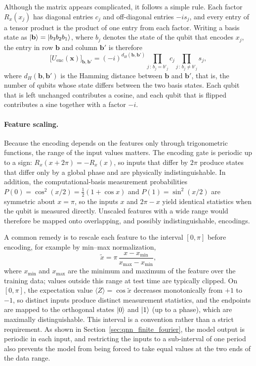 \documentclass[12pt]{article}
\numberwithin{equation}{section}  %
\begin{document}
Although the matrix appears complicated, it follows a simple rule. Each factor $R_x(x_j)$ has diagonal entries $c_j$ and off-diagonal entries $-is_j$, and every entry of a tensor product is the product of one entry from each factor. Writing a basis state as $\ket{\mathbf{b}} = \ket{b_3 b_2 b_1}$, where $b_j$ denotes the state of the qubit that encodes $x_j$, the entry in row $\mathbf{b}$ and column $\mathbf{b}'$ is therefore
\begin{equation}
\bigl[U_{\mathrm{enc}}(\mathbf{x})\bigr]_{\mathbf{b}, \mathbf{b}'}
= (-i)^{d_H(\mathbf{b}, \mathbf{b}')} \prod_{j\,:\, b_j = b'_j} c_j \prod_{j\,:\, b_j \neq b'_j} s_j,
\label{eq:encoding_entries}
\end{equation}
where $d_H(\mathbf{b}, \mathbf{b}')$ is the Hamming distance between $\mathbf{b}$ and $\mathbf{b}'$, that is, the number of qubits whose state differs between the two basis states. Each qubit that is left unchanged contributes a cosine, and each qubit that is flipped contributes a sine together with a factor $-i$.

\paragraph{Feature scaling.} Because the encoding depends on the features only through trigonometric functions, the range of the input values matters. The encoding gate is periodic up to a sign: $R_x(x + 2\pi) = -R_x(x)$, so inputs that differ by $2\pi$ produce states that differ only by a global phase and are physically indistinguishable. In addition, the computational-basis measurement probabilities $P(0) = \cos^2(x/2) = \frac{1}{2}(1 + \cos x)$ and $P(1) = \sin^2(x/2)$ are symmetric about $x = \pi$, so the inputs $x$ and $2\pi - x$ yield identical statistics when the qubit is measured directly. Unscaled features with a wide range would therefore be mapped onto overlapping, and possibly indistinguishable, encodings.

A common remedy is to rescale each feature to the interval $[0, \pi]$ before encoding, for example by min--max normalization,
\begin{equation}
\tilde{x} = \pi\, \frac{x - x_{\min}}{x_{\max} - x_{\min}},
\label{eq:minmax_scaling}
\end{equation}
where $x_{\min}$ and $x_{\max}$ are the minimum and maximum of the feature over the training data; values outside this range at test time are typically clipped. On $[0, \pi]$, the expectation value $\langle Z \rangle = \cos\tilde{x}$ decreases monotonically from $+1$ to $-1$, so distinct inputs produce distinct measurement statistics, and the endpoints are mapped to the orthogonal states $\ket{0}$ and $\ket{1}$ (up to a phase), which are maximally distinguishable. This interval is a convention rather than a strict requirement. As shown in Section~\ref{sec:qnn_finite_fourier}, the model output is periodic in each input, and restricting the inputs to a sub-interval of one period also prevents the model from being forced to take equal values at the two ends of the data range.
\end{document}
